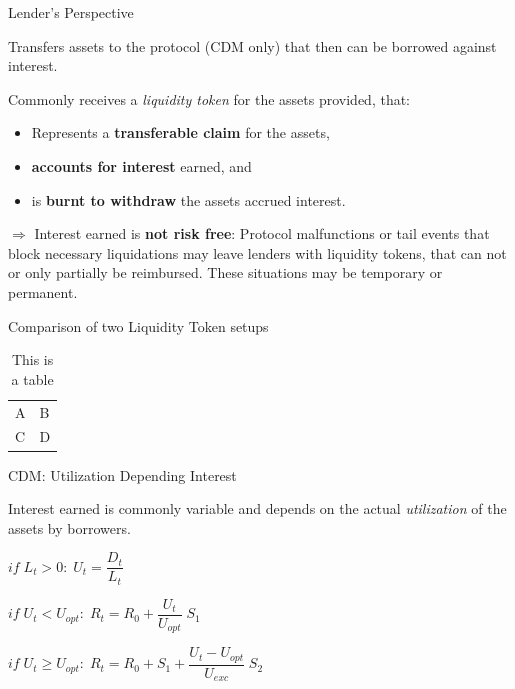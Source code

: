 \documentclass[handout]{beamer}
\begin{document}
\begin{frame}{Lender's Perspective}

Transfers assets to the protocol (CDM only) that then can be borrowed against interest.

\vspace{1.0em}

Commonly receives a \emph{liquidity token} for the assets provided, that:
\vspace{0.5em}
\begin{itemize}
  \item Represents a \textbf{transferable claim} for the assets,
  \item \textbf{accounts for interest} earned, and
  \item is \textbf{burnt to withdraw} the assets accrued interest.
\end{itemize}

\vspace{1.0em}
$\Rightarrow$ Interest earned is \textbf{not risk free}: Protocol malfunctions or tail events that block necessary liquidations may leave lenders with liquidity tokens, that can not or only partially be reimbursed. These situations may be temporary or permanent.

\end{frame}


\begin{frame}{Comparison of two Liquidity Token setups}

	\begin{table}
		\begin{tabular}{ll}
			A & B\\
			C & D
		\end{tabular}
		\caption{This is a table}
		\label{tbl:simpletable}
	\end{table}
	
\end{frame}


\begin{frame}{CDM: Utilization Depending Interest }

Interest earned is commonly variable and depends on the actual \textit{utilization} of the assets by borrowers.

\begin{figure}[t]
	\centering
	\begin{tikzpicture}[scale=1.0, every node/.style={scale=1.0}]
		
	\end{tikzpicture}
\end{figure}

$if \;L_t > 0 : \; U_t = \dfrac{D_t}{L_t}$

\vspace{1em}

$if \;  U_t < U_{opt} : \; R_t = R_0 + \dfrac{U_t} {U_{opt}}  \; S_1$

\vspace{1em}

$if \; U_t \geq U_{opt} : \; R_t = R_0 + S_1 + \dfrac{U_t - U_{opt}}{U_{exc}}\; S_2$
	
\end{frame}
\end{document}
